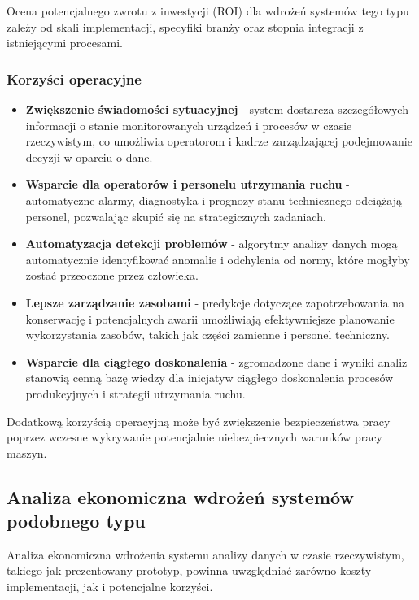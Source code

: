 Ocena potencjalnego zwrotu z inwestycji (ROI) dla wdrożeń systemów tego typu zależy od skali implementacji, specyfiki branży oraz stopnia integracji z istniejącymi procesami.

\subsubsection{Korzyści operacyjne}
\label{subsubsec:korzysci_operacyjne}

\begin{itemize}
    \item \textbf{Zwiększenie świadomości sytuacyjnej} - system dostarcza szczegółowych informacji o stanie monitorowanych urządzeń i procesów w czasie rzeczywistym, co umożliwia operatorom i kadrze zarządzającej podejmowanie decyzji w oparciu o dane.
    \item \textbf{Wsparcie dla operatorów i personelu utrzymania ruchu} - automatyczne alarmy, diagnostyka i prognozy stanu technicznego odciążają personel, pozwalając skupić się na strategicznych zadaniach.
    \item \textbf{Automatyzacja detekcji problemów} - algorytmy analizy danych mogą automatycznie identyfikować anomalie i odchylenia od normy, które mogłyby zostać przeoczone przez człowieka.
    \item \textbf{Lepsze zarządzanie zasobami} - predykcje dotyczące zapotrzebowania na konserwację i potencjalnych awarii umożliwiają efektywniejsze planowanie wykorzystania zasobów, takich jak części zamienne i personel techniczny.
    \item \textbf{Wsparcie dla ciągłego doskonalenia} - zgromadzone dane i wyniki analiz stanowią cenną bazę wiedzy dla inicjatyw ciągłego doskonalenia procesów produkcyjnych i strategii utrzymania ruchu.
\end{itemize}

Dodatkową korzyścią operacyjną może być zwiększenie bezpieczeństwa pracy poprzez wczesne wykrywanie potencjalnie niebezpiecznych warunków pracy maszyn.

\subsection{Analiza ekonomiczna wdrożeń systemów podobnego typu}
\label{subsec:analiza_ekonomiczna}

Analiza ekonomiczna wdrożenia systemu analizy danych w czasie rzeczywistym, takiego jak prezentowany prototyp, powinna uwzględniać zarówno koszty implementacji, jak i potencjalne korzyści.

